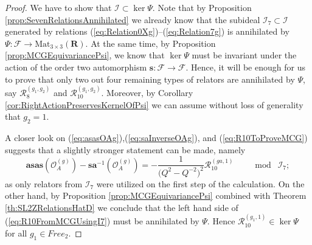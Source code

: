 \documentclass{amsart}
\newcommand{\Oa}{\mathcal O_A}
\newcommand{\R}{\mathcal R}
\begin{document}
\begin{proof}
We have to show that $\mathcal I\subset\ker\Psi$. Note that by Proposition \ref{prop:SevenRelationsAnnihilated} we already know that the subideal $\mathcal I_7\subset\mathcal I$ generated by relations (\ref{eq:Relation0Xg})--(\ref{eq:Relation7g}) is annihilated by $\Psi:\mathcal F\rightarrow\mathrm{Mat}_{3\times3}(\mathbf R)$. At the same time, by Proposition \ref{prop:MCGEquivariancePsi}, we know that $\ker\Psi$ must be invariant under the action of the order two automorphism $\mathbf s:\mathcal F\rightarrow\mathcal F$. Hence, it will be enough for us to prove that only two out four remaining types of relators are annihilated by $\Psi$, say $\R_8^{(g_1,g_2)}$ and $\R_{10}^{(g_1,g_2)}$. Moreover, by Corollary \ref{cor:RightActionPreservesKernelOfPsi} we can assume without loss of generality that $g_2=1$.

A closer look on (\ref{eq:asasOAg}),(\ref{eq:saInverseOAg}), and (\ref{eq:R10ToProveMCG}) suggests that a slightly stronger statement can be made, namely
\begin{equation}
\mathbf a\mathbf s\mathbf a\mathbf s(\Oa^{(g)})-\mathbf s\mathbf a^{-1}(\Oa^{(g)})=-\frac1{\big(Q^2-Q^{-2}\big)^2}\R_{10}^{(ga,1)}\qquad\bmod\;\mathcal I_7;
\label{eq:R10FromMCGUsingI7}
\end{equation}
as only relators from $\mathcal I_7$ were utilized on the first step of the calculation. On the other hand, by Proposition \ref{prop:MCGEquivariancePsi} combined with Theorem \ref{th:SL2ZRelationsHatD} we conclude that the left hand side of (\ref{eq:R10FromMCGUsingI7}) must be annihilated by $\Psi$. Hence $\R_{10}^{(g_1,1)}\in\ker\Psi$ for all $g_1\in Free_2$.


\end{proof}
\end{document}
